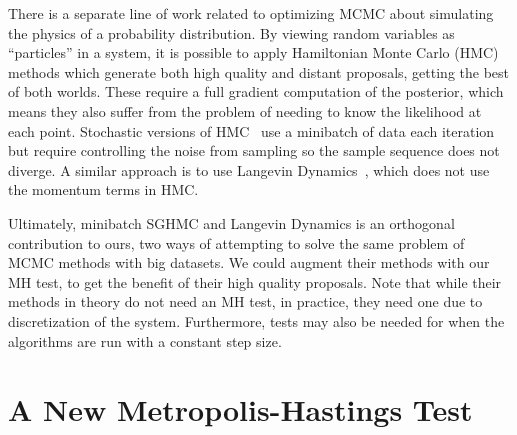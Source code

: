 \documentclass{article}
\begin{document}
There is a separate line of work related to optimizing MCMC about simulating the physics of a
probability distribution. By viewing random variables as ``particles'' in a system, it is possible
to apply Hamiltonian Monte Carlo (HMC)~\cite{mcmc_hamiltonian_2010} methods which generate both high
quality and distant proposals, getting the best of both worlds. These require a full gradient
computation of the posterior, which means they also suffer from the problem of needing to know the
likelihood at each point. Stochastic versions of HMC~\cite{sghmc_2014,stochastic_thermostats_2014}
use a minibatch of data each iteration but require controlling the noise from sampling so the sample
sequence does not diverge. A similar approach is to use Langevin
Dynamics~\cite{langevin_2011,conf/icml/AhnBW12}, which does not use the momentum terms in HMC.

Ultimately, minibatch SGHMC and Langevin Dynamics is an orthogonal contribution to ours, two ways of
attempting to solve the same problem of MCMC methods with big datasets. We could augment their
methods with our MH test, to get the benefit of their high quality proposals. Note that while their
methods in theory do not need an MH test, in practice, they need one due to discretization of the
system. Furthermore, tests may also be needed for when the algorithms are run with a constant step
size.





\section{A New Metropolis-Hastings Test}\label{sec:our_algorithm}
\end{document}

